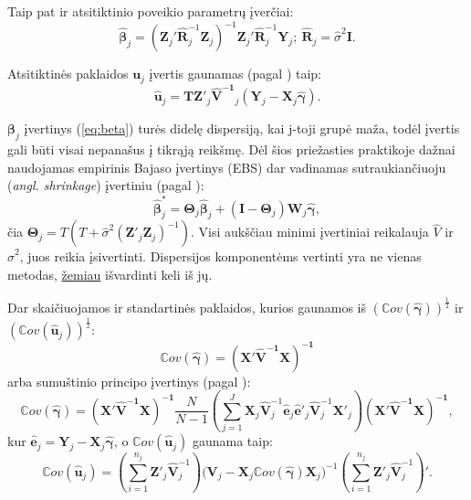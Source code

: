 \documentclass[11pt,a4paper]{article}
\begin{document}
Taip pat ir atsitiktinio poveikio parametrų įverčiai:
\begin{equation} \label{eq:beta}
\boldsymbol{\hat{\beta}}_j=\left(\mathbf{Z}_j'\mathbf{\hat{R}}^{-1}_j\mathbf{Z}_j\right)^{-1}\mathbf{Z}_j'\mathbf{\hat{R}}^{-1}_j\mathbf{Y}_j;\ \mathbf{\hat{R}}_j=\hat{\sigma}^2\mathbf{I}.
\end{equation}

Atsitiktinės paklaidos $\mathbf{u}_j$ įvertis gaunamas (pagal \cite{EBi}) taip:
\begin{equation*}
\mathbf{\hat{u}}_j=\mathbf{TZ}'_j\mathbf{\hat{V}^{-1}}_j\left(\mathbf{Y}_j-\mathbf{X}_j\boldsymbol{\hat{\gamma}}\right).
\end{equation*}

$\boldsymbol{\beta}_j$ įvertinys (\ref{eq:beta}) turės didelę dispersiją, kai j-toji grupė maža, todėl įvertis gali būti visai nepanašus į tikrąją reikšmę. Dėl šios priežasties praktikoje dažnai naudojamas empirinis Bajaso įvertinys (EBS) dar vadinamas sutraukiančiuoju (\textit{angl. shrinkage}) įvertiniu (pagal \cite{shrinkage}):
\begin{equation*}
\boldsymbol{\hat{\beta}}^*_{j}=\boldsymbol{\Theta}_j\boldsymbol{\hat{\beta}}_j+(\boldsymbol{I} - \boldsymbol{\Theta}_j)\mathbf{W}_j\boldsymbol{\hat{\gamma}},
\end{equation*}
čia $\mathbf{\Theta}_j=T\left(T+\hat{\sigma}^2(\mathbf{Z}'_j\mathbf{Z}_j)^{-1}\right)$. Visi aukščiau minimi įvertiniai reikalauja $\hat{V}$ ir $\hat{\sigma}^2$, juos reikia įsivertinti. Dispersijos komponentėms vertinti yra ne vienas metodas, \hyperlink{reml}{žemiau} išvardinti keli iš jų.

\indent Dar skaičiuojamos ir standartinės paklaidos, kurios gaunamos iš $(\mathbb{C}ov(\boldsymbol{\hat{\gamma}}))^{\frac{1}{2}}$ ir $(\mathbb{C}ov(\mathbf{\hat{u}}_j))^{\frac{1}{2}}$:
\begin{equation*}
\mathbb{C}ov(\boldsymbol{\hat{\gamma}})=\mathbf{(X'\hat{V}^{-1}X)^{-1}}
\end{equation*}
arba sumuštinio principo įvertinys (pagal \cite{sandwich}):
\begin{equation*}
\mathbb{C}ov(\boldsymbol{\hat{\gamma}})=\mathbf{(X'\hat{V}^{-1}X)^{-1}}\frac{N}{N-1}\left(\sum^J_{j=1}\mathbf{X}_j\mathbf{\hat{V}}^{-1}_j\mathbf{\hat{e}}_j\mathbf{\hat{e}}'_j \mathbf{\hat{V}}^{-1}_j\mathbf{X}'_j\right)\mathbf{(X'\hat{V}^{-1}X)^{-1}},
\end{equation*}
kur $\mathbf{\hat{e}}_j=\mathbf{Y}_j-\mathbf{X}_j\boldsymbol{\hat{\gamma}}$, o $\mathbb{C}ov(\mathbf{\hat{u}}_j)$ gaunama taip:
\begin{equation*}
\mathbb{C}ov(\mathbf{\hat{u}}_j)=\left(\sum^{n_j}_{i=1}\mathbf{Z}'_j\mathbf{\hat{V}}^{-1}_j\right) \Bigg(\mathbf{V}_j-\mathbf{X}_j\mathbb{C}ov(\boldsymbol{\hat{\gamma}})\mathbf{X}_j\Bigg)^{-1} \left(\sum^{n_j}_{i=1}\mathbf{Z}'_j\mathbf{\hat{V}}^{-1}_j\right)'.
\end{equation*}
\end{document}
